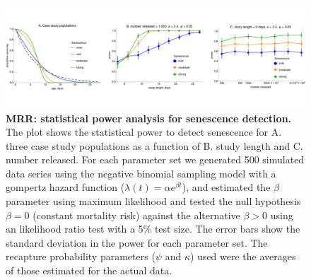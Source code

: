 \documentclass[12pt]{article}
\begin{document}
\begin{figure}[ht]
	\centerline{\includegraphics[width=1.25\textwidth]{./Figure_files/mrr_mcPowerAnalysis_senescence.pdf}}
	\caption{\textbf{MRR: statistical power analysis for senescence detection.} The plot shows the statistical power to detect senescence for A. three case study populations as a function of B. study length and C. number released. For each parameter set we generated 500 simulated data series using the negative binomial sampling model with a gompertz hazard function ($\lambda(t) = \alpha e^{\beta t}$), and estimated the $\beta$ parameter using maximum likelihood and tested the null hypothesis $\beta=0$ (constant mortality risk) against the alternative $\beta>0$ using an likelihood ratio test with a 5\% test size. The error bars show the standard deviation in the power for each parameter set. The recapture probability parameters ($\psi$ and $\kappa$) used were the averages of those estimated for the actual data.}
	\label{fig:mrr_mcPowerAnalysis_senescence}
\end{figure}
\end{document}
